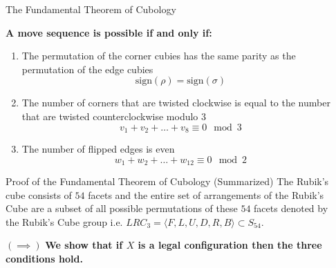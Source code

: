 \documentclass[final]{beamer}
\newlength{\sepwidth}
\newlength{\colwidth}
\newcommand{\separatorcolumn}{\begin{column}{\sepwidth}\end{column}}
\begin{document}
\begin{frame}[t]
\begin{columns}[t]
\separatorcolumn

\begin{column}{\colwidth}

  \begin{alertblock}{The Fundamental Theorem of Cubology}

    \textbf{A move sequence is possible if and only if:}

    \begin{enumerate}
      \item The permutation of the corner cubies has the same parity as the permutation of the edge cubies
      $$\text{sign}(\rho) = \text{sign}(\sigma)$$
      \item The number of corners that are twisted clockwise is equal to the number that are twisted counterclockwise modulo $3$
      $$v_{1} + v_{2} +\dots +v_{8} \equiv 0 \mod 3$$
      \item The number of flipped edges is even
      $$w_{1} + w_{2} +\dots +w_{12} \equiv 0 \mod 2$$
    \end{enumerate}


  \end{alertblock}

  \begin{block}{Proof of the Fundamental Theorem of Cubology (Summarized)}
    The Rubik's cube consists of $54$ facets and the entire set of arrangements of the Rubik's Cube are a subset of all possible permutations of these $54$ facets
    denoted by the Rubik's Cube group i.e. $LRC_{3} = \langle F,L,U,D,R,B\rangle \subset S_{54}$.



$(\implies)$
\textbf{We show that if $X$ is a legal configuration then the three conditions hold.}


\end{block}
\end{column}
\end{columns}
\end{frame}
\end{document}
